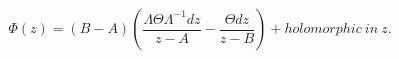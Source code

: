 \begin{equation}\label{exthe}
 \Phi(z)=(B-A)( \frac{ \Lambda \Theta \Lambda^{-1} dz }{z-A} -
\frac{ \Theta dz }{z-B})+holomorphic~in~z.
\end{equation}

